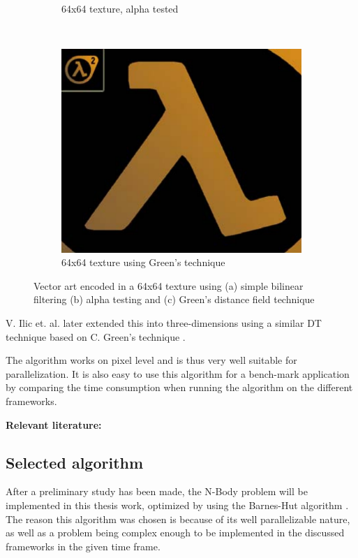 \documentclass{article}
\begin{document}
\begin{figure}[!h]
\begin{subfigure}[b]{0.3\textwidth}
        \caption{64x64 texture, alpha tested}
        \label{fig:valveA}
    \end{subfigure}
    ~ 
    \begin{subfigure}[b]{0.3\textwidth}
        \includegraphics[width=\textwidth]{Figs/ValveGreensTechnique.png}
        \caption{64x64 texture using Green's technique}
        \label{fig:mouse}
    \end{subfigure}
    \caption{Vector art encoded in a 64x64 texture using (a) simple bilinear filtering (b) alpha testing and (c) Green's distance field technique}\label{fig:animals}
    \label{fig:valve}
\end{figure}

V. Ilic et. al. later extended this into three-dimensions using a similar DT technique based on C. Green's technique \cite{ilic2015precise}. 

The algorithm works on pixel level and is thus very well suitable for parallelization. It is also easy to use this algorithm for a bench-mark application by comparing the time consumption when running the algorithm on the different frameworks.


\vspace{5mm}
\noindent \textbf{Relevant literature:}
\cite{green2007improved}
\cite{gustavson2011anti}
\cite{ilic2015precise}
\cite{gustavson20122d}
\cite{jones20063d}

\subsection{Selected algorithm}
After a preliminary study has been made, the N-Body problem will be implemented in this thesis work, optimized by using the Barnes-Hut algorithm \cite{barnes1986hierarchical}. The reason this algorithm was chosen is because of its well parallelizable nature, as well as a problem being complex enough to be implemented in the discussed frameworks in the given time frame.
\end{document}
